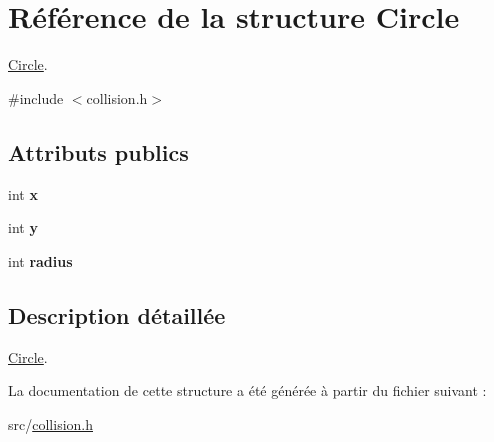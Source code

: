 \hypertarget{struct_circle}{\section{Référence de la structure Circle}
\label{struct_circle}
}


\hyperlink{struct_circle}{Circle}.  




{\ttfamily \#include $<$collision.\+h$>$}

\subsection*{Attributs publics}
\begin{DoxyCompactItemize}
\item 
\hypertarget{struct_circle_abceecd15b990054ddc30441cfcbb205d}{int {\bfseries x}}\label{struct_circle_abceecd15b990054ddc30441cfcbb205d}

\item 
\hypertarget{struct_circle_a78aef28b3c176d14e8d25f8cd84e7dfd}{int {\bfseries y}}\label{struct_circle_a78aef28b3c176d14e8d25f8cd84e7dfd}

\item 
\hypertarget{struct_circle_a897ad7e556f1e90142093c69079d8b05}{int {\bfseries radius}}\label{struct_circle_a897ad7e556f1e90142093c69079d8b05}

\end{DoxyCompactItemize}


\subsection{Description détaillée}
\hyperlink{struct_circle}{Circle}. 

La documentation de cette structure a été générée à partir du fichier suivant \+:\begin{DoxyCompactItemize}
\item 
src/\hyperlink{collision_8h}{collision.\+h}\end{DoxyCompactItemize}
